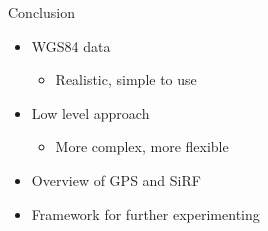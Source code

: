 \documentclass[utf8,12pt]{beamer}
\begin{document}
\begin{frame}{Conclusion}
    \begin{itemize}
        \item WGS84 data
        \begin{itemize}
            \item Realistic, simple to use
        \end{itemize}
        \item Low level approach
        \begin{itemize}
            \item More complex, more flexible
        \end{itemize}
        \item Overview of GPS and SiRF
        \item Framework for further experimenting
    \end{itemize}
\end{frame}

{
\begin{frame}
\end{frame}
}

%
\end{document}
